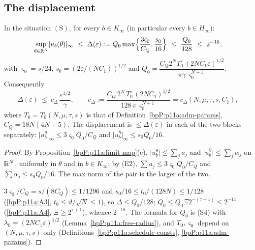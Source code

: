 \subsection{The displacement}\label{bpP:p11a:sec-disp}

\begin{theorem}\label{bpP:p11a:displacement}
In the situation $(\mathrm S)$, for every $b\in K_\infty$ (in particular every $b\in H_\infty$):
\[\sup_{\theta\in\R^N}\lvert u_b(\theta)\rvert_\infty\ \le\ \Delta(\varepsilon):=Q_0\max\Bigl\{\frac{3\varsigma_0}{C_Q},\frac{s_0}{16}\Bigr\}\ \le\ \frac{Q_0}{128}\ \le\ 2^{-18},\]
with $\varsigma_0=s/24$, $s_0=(2\varepsilon/(NC_1))^{1/2}$ and $Q_0=\dfrac{C_Q2^NT_0^{\tau}\,(2NC_1\varepsilon)^{1/2}}{\pi\gamma\,\varsigma_0^{N+1}}$. Consequently
\[\Delta(\varepsilon)\ \le\ c_\Delta\,\frac{\varepsilon^{1/2}}\gamma,\qquad c_\Delta:=\frac{C_Q\,2^{N}\,T_0^{\tau}\,(2NC_1)^{1/2}}{128\,\pi\,\varsigma_0^{N+1}}=c_\Delta(N,\mu,\tau,s,C_1),\]
where $T_0=T_0(N,\mu,\tau,s)$ is that of Definition~\ref{bpP:p11a:adm-params}, $C_Q=18N(4N+5)$. The displacement is $\le\Delta(\varepsilon)$ in each of the two blocks separately: $\lvert u^\theta_b\rvert_\infty\le3\varsigma_0Q_0/C_Q$ and $\lvert u^\eta_b\rvert_\infty\le s_0Q_0/16$.
\end{theorem}
\begin{proof}
\label{stepP:p11a:dp-tel} By Proposition~\ref{bpP:p11a:limit-map}(c), $\lvert u^\theta_b\rvert\le\sum_ja_j$ and $\lvert u^\eta_b\rvert\le\sum_j\alpha_j$ on $\mathbb{R}^N$, uniformly in $\theta$ and in $b\in K_\infty$; by (E2), $\sum a_j\le3\varsigma_0Q_0/C_Q$ and $\sum\alpha_j\le s_0Q_0/16$. The max norm of the pair is the larger of the two.

\label{stepP:p11a:dp-size} $3\varsigma_0/C_Q=s/(8C_Q)\le1/1296$ and $s_0/16\le t_0/(128N)\le1/128$ (\ref{bpP:p11a:A3}, $t_0\le\vartheta/\sqrt N\le1$), so $\Delta\le Q_0/128$; $Q_0\le Q_0\Xi2^{-(\tau+1)}\le2^{-11}$ (\ref{bpP:p11a:A4}, $\Xi\ge2^{\tau+1}$), whence $2^{-18}$. The formula for $Q_0$ is (S4) with $\lambda_0=(2NC_1\varepsilon)^{1/2}$ (Lemma~\ref{bpP:p11a:free-radius}), and $T_0,\varsigma_0$ depend on $(N,\mu,\tau,s)$ only (Definitions~\ref{bpP:p11a:schedule-consts}, \ref{bpP:p11a:adm-params}).
\end{proof}

